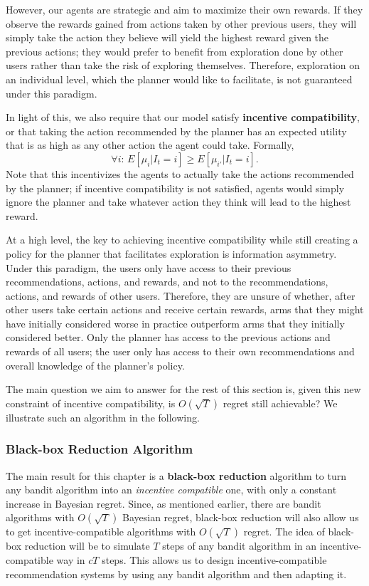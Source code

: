\documentclass[
  letterpaper,
  DIV=11,
  numbers=noendperiod,
  oneside]{scrreprt}
\theoremstyle{remark}
\begin{document}
However, our agents are strategic and aim to maximize their own rewards.
If they observe the rewards gained from actions taken by other previous
users, they will simply take the action they believe will yield the
highest reward given the previous actions; they would prefer to benefit
from exploration done by other users rather than take the risk of
exploring themselves. Therefore, exploration on an individual level,
which the planner would like to facilitate, is not guaranteed under this
paradigm.

In light of this, we also require that our model satisfy
\textbf{incentive compatibility}, or that taking the action recommended
by the planner has an expected utility that is as high as any other
action the agent could take. Formally,
\[\forall i : \, E[\mu_i | I_t = i] \geq E[\mu_{i'} | I_t = i].\] Note
that this incentivizes the agents to actually take the actions
recommended by the planner; if incentive compatibility is not satisfied,
agents would simply ignore the planner and take whatever action they
think will lead to the highest reward.

At a high level, the key to achieving incentive compatibility while
still creating a policy for the planner that facilitates exploration is
information asymmetry. Under this paradigm, the users only have access
to their previous recommendations, actions, and rewards, and not to the
recommendations, actions, and rewards of other users. Therefore, they
are unsure of whether, after other users take certain actions and
receive certain rewards, arms that they might have initially considered
worse in practice outperform arms that they initially considered better.
Only the planner has access to the previous actions and rewards of all
users; the user only has access to their own recommendations and overall
knowledge of the planner's policy.

The main question we aim to answer for the rest of this section is,
given this new constraint of incentive compatibility, is \(O(\sqrt{T})\)
regret still achievable? We illustrate such an algorithm in the
following.

\subsubsection*{Black-box Reduction
Algorithm}\label{black-box-reduction-algorithm}

The main result for this chapter is a \textbf{black-box reduction}
algorithm to turn any bandit algorithm into an \emph{incentive
compatible} one, with only a constant increase in Bayesian regret.
Since, as mentioned earlier, there are bandit algorithms with
\(O(\sqrt{T})\) Bayesian regret, black-box reduction will also allow us
to get incentive-compatible algorithms with \(O(\sqrt{T})\) regret. The
idea of black-box reduction will be to simulate \(T\) steps of any
bandit algorithm in an incentive-compatible way in \(c T\) steps. This
allows us to design incentive-compatible recommendation systems by using
any bandit algorithm and then adapting it.
\end{document}
